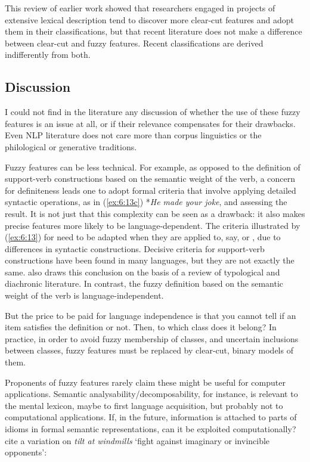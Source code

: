 \documentclass[output=paper]{langsci/langscibook}
\begin{document}
This review of earlier work showed that researchers engaged in projects of extensive lexical description tend to discover more clear-cut features and adopt them in their classifications, but that recent literature does not make a difference between clear-cut and fuzzy features. Recent classifications are derived indifferently from both.

\subsection{Discussion}
\label{fuzzyfeaturediscussion}

I could not find in the literature any discussion of whether the use of these fuzzy features is an issue at all, or if their relevance compensates for their drawbacks.  Even NLP literature does not care more than corpus linguistics or the philological or generative traditions.

Fuzzy features can be less technical. For example, as opposed to the definition of support-verb constructions based on the semantic weight of the verb, a concern for definiteness leads one to adopt formal criteria that involve applying detailed  syntactic operations, as in (\ref{ex:6:13c}) *\textit{He made your joke}, and assessing the result. It is not just that this complexity can be seen as a drawback: it also makes precise features more likely to be language-dependent. The criteria illustrated by (\ref{ex:6:13}) for  need to be adapted when they are applied to, say,  or , due to differences in syntactic constructions. Decisive criteria for support-verb constructions have been found in many languages, but they are not exactly the same. \citet{Butt2010} also draws this conclusion on the basis of a review of typological and diachronic literature. In contrast, the fuzzy definition based on the semantic weight of the verb is language-independent.

But the price to be paid for language independence is that you cannot tell if an item satisfies the definition or not. Then, to which class does it belong? In practice, in order to avoid fuzzy membership of classes, and uncertain inclusions between classes, fuzzy features must be replaced by clear-cut, binary models of them. 

Proponents of fuzzy features rarely claim these might be useful for computer applications. 
Semantic analysability\slash decomposability, for instance, is relevant to  the mental lexicon, maybe to first language acquisition, but probably not to computational applications. If, in the future, information is attached to parts of idioms in formal semantic representations, can it be exploited computationally? \cite[501]{Nunberg1994} cite a variation on \textit{tilt at windmills} ‘fight against imaginary or invincible opponents’:
\end{document}
